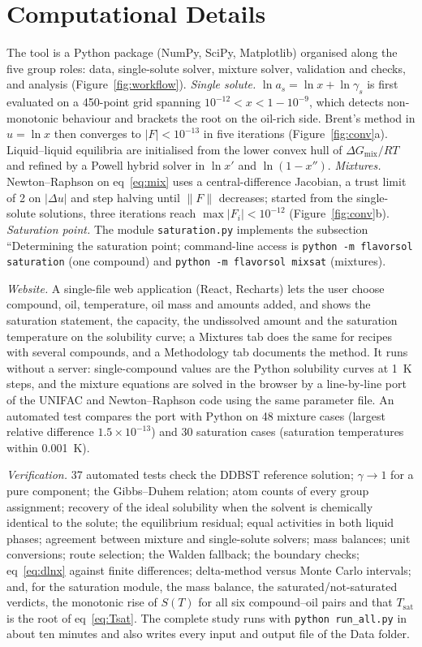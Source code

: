 \documentclass[journal=jceaax,manuscript=article,layout=twocolumn]{achemso}
\begin{document}
\section{Computational Details}
The tool is a Python package (NumPy, SciPy, Matplotlib)\cite{numpy2020,scipy2020,matplotlib2007} organised along the five group roles: data, single-solute solver, mixture solver, validation and checks, and analysis (Figure~\ref{fig:workflow}). \textit{Single solute.} $\ln a_s=\ln x+\ln\gamma_s$ is first evaluated on a 450-point grid spanning $10^{-12}<x<1-10^{-9}$, which detects non-monotonic behaviour and brackets the root on the oil-rich side. Brent's method\cite{brent1973} in $u=\ln x$ then converges to $|F|<10^{-13}$ in five iterations (Figure~\ref{fig:conv}a). Liquid--liquid equilibria are initialised from the lower convex hull of $\Delta G_\mathrm{mix}/RT$ and refined by a Powell hybrid solver in $\ln x'$ and $\ln(1-x'')$. \textit{Mixtures.} Newton--Raphson on eq~\ref{eq:mix} uses a central-difference Jacobian, a trust limit of 2 on $|\Delta u|$ and step halving until $\lVert F\rVert$ decreases; started from the single-solute solutions, three iterations reach $\max|F_i|<10^{-12}$ (Figure~\ref{fig:conv}b). \textit{Saturation point.} The module \texttt{saturation.py} implements the subsection ``Determining the saturation point; command-line access is \texttt{python -m flavorsol saturation} (one compound) and \texttt{python -m flavorsol mixsat} (mixtures).

\textit{Website.} A single-file web application (React, Recharts) lets the user choose compound, oil, temperature, oil mass and amounts added, and shows the saturation statement, the capacity, the undissolved amount and the saturation temperature on the solubility curve; a Mixtures tab does the same for recipes with several compounds, and a Methodology tab documents the method. It runs without a server: single-compound values are the Python solubility curves at 1~K steps, and the mixture equations are solved in the browser by a line-by-line port of the UNIFAC and Newton--Raphson code using the same parameter file. An automated test compares the port with Python on 48 mixture cases (largest relative difference $1.5\times10^{-13}$) and 30 saturation cases (saturation temperatures within 0.001~K).

\textit{Verification.} 37 automated tests check the DDBST reference solution; $\gamma\to1$ for a pure component; the Gibbs--Duhem relation; atom counts of every group assignment; recovery of the ideal solubility when the solvent is chemically identical to the solute; the equilibrium residual; equal activities in both liquid phases; agreement between mixture and single-solute solvers; mass balances; unit conversions; route selection; the Walden fallback; the boundary checks; eq~\ref{eq:dlnx} against finite differences; delta-method versus Monte Carlo intervals; and, for the saturation module, the mass balance, the saturated/not-saturated verdicts, the monotonic rise of $S(T)$ for all six compound--oil pairs and that $T_\mathrm{sat}$ is the root of eq~\ref{eq:Tsat}. The complete study runs with \texttt{python run\_all.py} in about ten minutes and also writes every input and output file of the Data folder.
\end{document}
